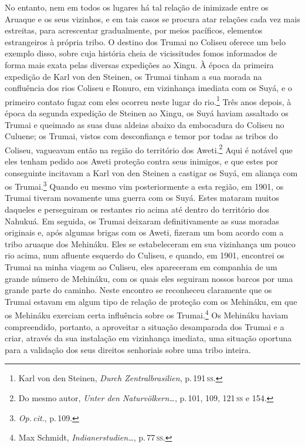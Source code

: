 No entanto, nem em todos os lugares há tal relação de inimizade
entre os Aruaque e os seus vizinhos, e em tais casos se procura atar
relações cada vez mais estreitas, para acrescentar gradualmente, por
meios pacíficos, elementos estrangeiros à própria tribo. O destino dos
Trumai no Coliseu oferece um belo exemplo disso, sobre cuja história
cheia de vicissitudes fomos informados de forma mais exata pelas
diversas expedições ao Xingu. À época da primeira expedição de Karl von
den Steinen, os Trumai tinham a sua morada na confluência dos rios
Coliseu e Ronuro, em vizinhança imediata com os Suyá, e o primeiro
contato fugaz com eles ocorreu neste lugar do rio.\footnote{Karl von den
  Steinen, \textit{Durch Zentralbrasilien}, p.\,191\,\textsc{ss}.} Três anos depois,
à época da segunda expedição de Steinen ao Xingu, os Suyá haviam
assaltado os Trumai e queimado as suas duas aldeias abaixo da embocadura
do Coliseu no Culuene; os Trumai, vistos com desconfiança e temor por
todas as tribos do Coliseu, vagueavam então na região do território dos
Aweti.\footnote{Do mesmo autor, \textit{Unter den Naturvölkern\ldots}, p.\,101, 109, 121\,\textsc{ss} e 154.} Aqui é notável que
eles tenham pedido aos Aweti proteção contra seus inimigos, e que estes
por conseguinte incitavam a Karl von den Steinen a castigar os Suyá, em
aliança com os Trumai.\footnote{\textit{Op.\,cit}., p.\,109.} Quando eu mesmo vim
posteriormente a esta região, em 1901, os Trumai tiveram novamente uma
guerra com os Suyá. Estes mataram muitos daqueles e perseguiram os
restantes rio acima até dentro do território dos Nahukuá. Em seguida, os
Trumai deixaram definitivamente as suas moradas originais e, após
algumas brigas com os Aweti, fizeram um bom acordo com a tribo aruaque
dos Mehináku. Eles se estabeleceram em sua vizinhança um pouco rio
acima, num afluente esquerdo do Culiseu, e quando, em 1901, encontrei os
Trumai na minha viagem ao Culiseu, eles apareceram em companhia de um
grande número de Mehináku, com os quais eles seguiram nossos barcos por
uma grande parte do caminho. Neste encontro se reconheceu claramente
que os Trumai estavam em algum tipo de relação de proteção com os
Mehináku, em que os Mehináku exerciam certa influência sobre os
Trumai.\footnote{Max Schmidt, \textit{Indianerstudien\ldots},
  p.\,77\,\textsc{ss}.} Os Mehináku haviam compreendido, portanto, a aproveitar a
situação desamparada dos Trumai e a criar, através da sua instalação em
vizinhança imediata, uma situação oportuna para a validação dos seus
direitos senhoriais sobre uma tribo inteira.

